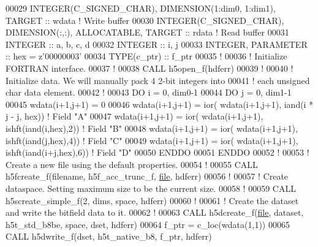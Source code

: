 \begin{DoxyCode}
00029   \textcolor{keywordtype}{INTEGER(C\_SIGNED\_CHAR)}, \textcolor{keywordtype}{DIMENSION(1:dim0, 1:dim1)}, \textcolor{keywordtype}{TARGET} :: wdata              \textcolor{comment}{! Write buffer }
00030   \textcolor{keywordtype}{INTEGER(C\_SIGNED\_CHAR)}, \textcolor{keywordtype}{DIMENSION(:,:)}, \textcolor{keywordtype}{ALLOCATABLE}, \textcolor{keywordtype}{TARGET} :: rdata    \textcolor{comment}{! Read buffer}
00031   \textcolor{keywordtype}{INTEGER} :: a, b, c, d
00032   \textcolor{keywordtype}{INTEGER} :: i, j
00033   \textcolor{keywordtype}{INTEGER}, \textcolor{keywordtype}{PARAMETER} :: hex =  z\textcolor{stringliteral}{'00000003'}
00034   \textcolor{keywordtype}{TYPE}(c\_ptr) :: f\_ptr
00035   \textcolor{comment}{!}
00036   \textcolor{comment}{! Initialize FORTRAN interface.}
00037   \textcolor{comment}{!}
00038   \textcolor{keyword}{CALL }h5open\_f(hdferr)
00039   \textcolor{comment}{!}
00040   \textcolor{comment}{! Initialize data.  We will manually pack 4 2-bit integers into}
00041   \textcolor{comment}{! each unsigned char data element.}
00042   \textcolor{comment}{!}
00043   \textcolor{keywordflow}{DO} i = 0, dim0-1
00044      \textcolor{keywordflow}{DO} j = 0, dim1-1
00045         wdata(i+1,j+1) = 0
00046         wdata(i+1,j+1) = ior( wdata(i+1,j+1), iand(i * j - j, hex))   \textcolor{comment}{! Field "A"}
00047         wdata(i+1,j+1) = ior( wdata(i+1,j+1), ishft(iand(i,hex),2))   \textcolor{comment}{! Field "B"}
00048         wdata(i+1,j+1) = ior( wdata(i+1,j+1), ishft(iand(j,hex),4))   \textcolor{comment}{! Field "C"}
00049         wdata(i+1,j+1) = ior( wdata(i+1,j+1), ishft(iand(i+j,hex),6)) \textcolor{comment}{! Field "D"}
00050 \textcolor{keywordflow}{     ENDDO}
00051 \textcolor{keywordflow}{  ENDDO}
00052   \textcolor{comment}{!}
00053   \textcolor{comment}{! Create a new file using the default properties.}
00054   \textcolor{comment}{!}
00055   \textcolor{keyword}{CALL }h5fcreate\_f(filename, h5f\_acc\_trunc\_f, \hyperlink{structfile}{file}, hdferr)
00056   \textcolor{comment}{!}
00057   \textcolor{comment}{! Create dataspace.  Setting maximum size to be the current size.}
00058   \textcolor{comment}{!}
00059   \textcolor{keyword}{CALL }h5screate\_simple\_f(2, dims, space, hdferr)
00060   \textcolor{comment}{!}
00061   \textcolor{comment}{! Create the dataset and write the bitfield data to it.}
00062   \textcolor{comment}{!}
00063   \textcolor{keyword}{CALL }h5dcreate\_f(\hyperlink{structfile}{file}, dataset, h5t\_std\_b8be, space, dset, hdferr)
00064   f\_ptr = c\_loc(wdata(1,1))
00065   \textcolor{keyword}{CALL }h5dwrite\_f(dset, h5t\_native\_b8, f\_ptr, hdferr)

\end{DoxyCode}
